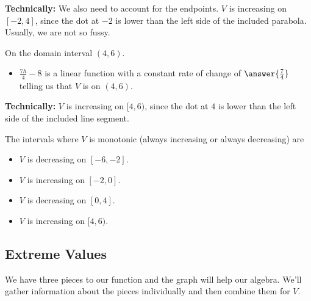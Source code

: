 \documentclass{ximera}
\begin{document}
\textbf{Technically:} We also need to account for the endpoints. $V$ is increasing on $[-2, 4]$, since the dot at $-2$ is lower than the left side of the included parabola. Usually, we are not so fussy.


\begin{question}

On the domain interval $(4, 6)$. 

\begin{itemize}
\item \textbf{$\frac{7h}{4} - 8$} is a linear function with a constant rate of change of $\answer{\frac{7}{4}}$ telling us that $V$ is  on $(4, 6)$.
\end{itemize}
\end{question}

\textbf{Technically:} $V$ is increasing on $[4, 6)$, since the dot at $4$ is lower than the left side of the included line segment.


The intervals where $V$ is monotonic (always increasing or always decreasing) are

\begin{itemize}
\item $V$ is decreasing on $[-6,-2]$.
\item $V$ is increasing on $[-2,0]$.
\item $V$ is decreasing on $[0,4]$.
\item $V$ is increasing on $[4,6)$.
\end{itemize}


















\subsection*{Extreme Values} 


We have three pieces to our function and the graph will help our algebra. We'll gather information about the pieces individually and then combine them for $V$.
\end{document}
